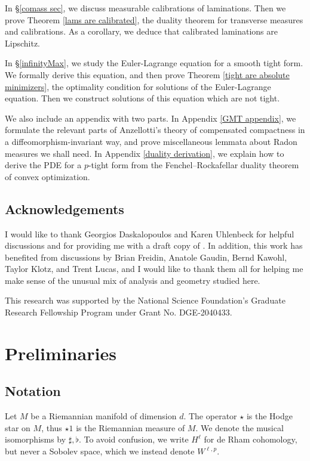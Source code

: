 \documentclass[reqno,11pt]{amsart}
\theoremstyle{definition}
\numberwithin{equation}{section}
\begin{document}
In \S\ref{comass sec}, we discuss measurable calibrations of laminations.
Then we prove Theorem \ref{lams are calibrated}, the duality theorem for transverse measures and calibrations.
As a corollary, we deduce that calibrated laminations are Lipschitz.


In \S\ref{infinityMax}, we study the Euler-Lagrange equation for a smooth tight form.
We formally derive this equation, and then prove Theorem \ref{tight are absolute minimizers}, the optimality condition for solutions of the Euler-Lagrange equation.
Then we construct solutions of this equation which are not tight.

We also include an appendix with two parts.
In Appendix \ref{GMT appendix}, we formulate the relevant parts of Anzellotti's theory of compensated compactness in a diffeomorphism-invariant way, and prove miscellaneous lemmata about Radon measures we shall need.
In Appendix \ref{duality derivation}, we explain how to derive the PDE for a $p$-tight form from the Fenchel--Rockafellar duality theorem of convex optimization.

\subsection{Acknowledgements}
I would like to thank Georgios Daskalopoulos and Karen Uhlenbeck for helpful discussions and for providing me with a draft copy of \cite{daskalopoulos2023}.
In addition, this work has benefited from discussions by Brian Freidin, Anatole Gaudin, Bernd Kawohl, Taylor Klotz, and Trent Lucas, and I would like to thank them all for helping me make sense of the unusual mix of analysis and geometry studied here.

This research was supported by the National Science Foundation's Graduate Research Fellowship Program under Grant No. DGE-2040433.

\section{Preliminaries}\label{prelims}
\subsection{Notation}
Let $M$ be a Riemannian manifold of dimension $d$.
The operator $\star$ is the Hodge star on $M$, thus $\star 1$ is the Riemannian measure of $M$.
We denote the musical isomorphisms by $\sharp, \flat$.
To avoid confusion, we write $H^\ell$ for de Rham cohomology, but never a Sobolev space, which we instead denote $W^{\ell, p}$.
\end{document}
